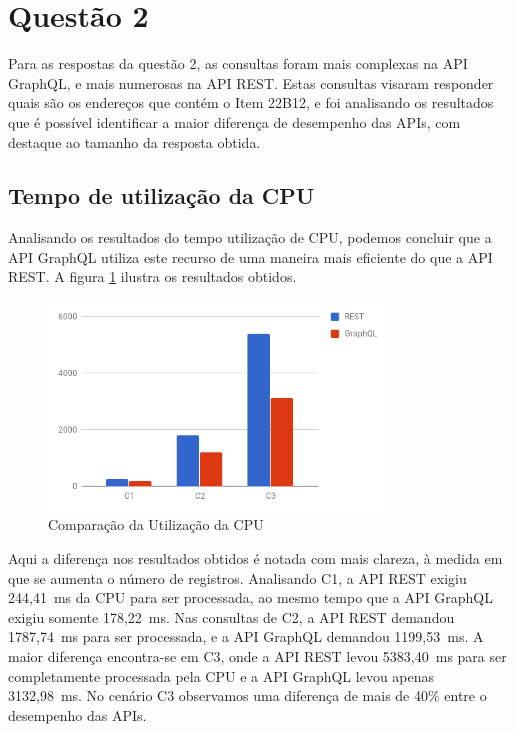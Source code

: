 
\section{Questão 2}

Para as respostas da questão 2, as consultas foram mais complexas na API GraphQL, e mais numerosas na API REST. Estas consultas visaram responder quais são os endereços que contém o Item 22B12, e foi analisando os resultados que é possível identificar a maior diferença de desempenho das APIs, com destaque ao tamanho da resposta obtida.

\subsection{Tempo de utilização da CPU}

Analisando os resultados do tempo utilização de CPU, podemos concluir que a API GraphQL utiliza este recurso de uma maneira mais eficiente do que a API REST. A figura \ref{fig:q2-cpu} ilustra os resultados obtidos.

\begin{figure}[htbp]
    \centering
    \includegraphics[width=0.8\textwidth]{figuras/q2-cpu.png}
    \caption{Comparação da Utilização da CPU}
    \label{fig:q2-cpu}
    \author{fonte: Autor}
\end{figure}

Aqui a diferença nos resultados obtidos é notada com mais clareza, à medida em que se aumenta o número de registros. Analisando C1, a API REST exigiu 244,41~ms da CPU para ser processada, ao mesmo tempo que a API GraphQL exigiu somente 178,22~ms. Nas consultas de C2, a API REST demandou 1787,74~ms para ser processada, e a API GraphQL demandou 1199,53~ms. A maior diferença encontra-se em C3, onde a API REST levou 5383,40~ms para ser completamente processada pela CPU e a API GraphQL levou apenas 3132,98~ms. No cenário C3 observamos uma diferença de mais de 40\% entre o desempenho das APIs.

